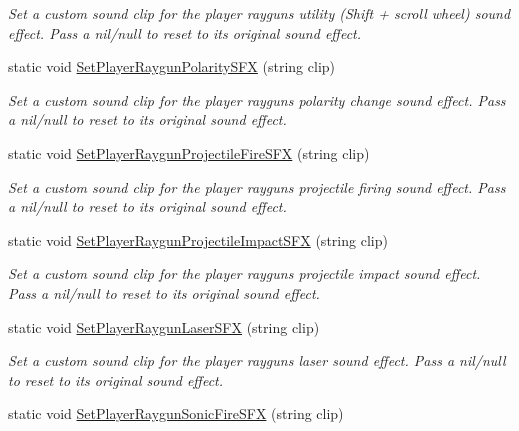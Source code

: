 \begin{DoxyCompactItemize}
\begin{DoxyCompactList}\small\item\em Set a custom sound clip for the player raygun\textquotesingle{}s utility (Shift + scroll wheel) sound effect. Pass a nil/null to reset to its original sound effect. \end{DoxyCompactList}\item 
static void \mbox{\hyperlink{class_lua_1_1_custom_sound_manager_aeb74ff0f630bbb90bada33635f382d66}{Set\+Player\+Raygun\+Polarity\+S\+FX}} (string clip)
\begin{DoxyCompactList}\small\item\em Set a custom sound clip for the player raygun\textquotesingle{}s polarity change sound effect. Pass a nil/null to reset to its original sound effect. \end{DoxyCompactList}\item 
static void \mbox{\hyperlink{class_lua_1_1_custom_sound_manager_acb7307ffeed459bb90bf63f20f5fa3b9}{Set\+Player\+Raygun\+Projectile\+Fire\+S\+FX}} (string clip)
\begin{DoxyCompactList}\small\item\em Set a custom sound clip for the player raygun\textquotesingle{}s projectile firing sound effect. Pass a nil/null to reset to its original sound effect. \end{DoxyCompactList}\item 
static void \mbox{\hyperlink{class_lua_1_1_custom_sound_manager_a5de014d5743332790a05044b5f918ee6}{Set\+Player\+Raygun\+Projectile\+Impact\+S\+FX}} (string clip)
\begin{DoxyCompactList}\small\item\em Set a custom sound clip for the player raygun\textquotesingle{}s projectile impact sound effect. Pass a nil/null to reset to its original sound effect. \end{DoxyCompactList}\item 
static void \mbox{\hyperlink{class_lua_1_1_custom_sound_manager_a3d7a983d62142d44f24d0e3dea537a65}{Set\+Player\+Raygun\+Laser\+S\+FX}} (string clip)
\begin{DoxyCompactList}\small\item\em Set a custom sound clip for the player raygun\textquotesingle{}s laser sound effect. Pass a nil/null to reset to its original sound effect. \end{DoxyCompactList}\item 
static void \mbox{\hyperlink{class_lua_1_1_custom_sound_manager_a923ad0297c9ec8e83ec48880b29a7670}{Set\+Player\+Raygun\+Sonic\+Fire\+S\+FX}} (string clip)

\end{DoxyCompactItemize}
